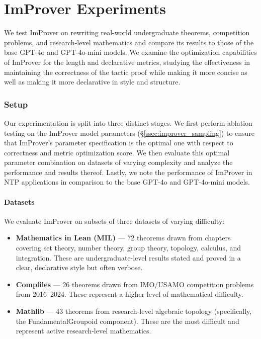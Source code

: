 \chapter{ImProver Experiments}\label{chap:improver-exp}

We test ImProver on rewriting real-world undergraduate theorems, competition problems, and research-level mathematics and compare its results to those of the base GPT-4o and GPT-4o-mini models. We examine the optimization capabilities of ImProver for the length and declarative metrics, studying the effectiveness in maintaining the correctness of the tactic proof while making it more concise as well as making it more declarative in style and structure.

\subsection{Setup}
\label{sec:improver_setup}

Our experimentation is split into three distinct stages. We first perform ablation testing on the ImProver model parameters (\S\ref{ssec:improver_sampling}) to ensure that ImProver's parameter specification is the optimal one with respect to correctness and metric optimization score. We then evaluate this optimal parameter combination on datasets of varying complexity and analyze the performance and results thereof. Lastly, we note the performance of ImProver in NTP applications in comparison to the base GPT-4o and GPT-4o-mini models.

\subsubsection{Datasets}

We evaluate ImProver on subsets of three datasets of varying difficulty:

\begin{itemize}
    \item \textbf{Mathematics in Lean (MIL)} \cite{MIL} --- 72 theorems drawn from chapters covering set theory, number theory, group theory, topology, calculus, and integration. These are undergraduate-level results stated and proved in a clear, declarative style but often verbose.
    \item \textbf{Compfiles} \cite{compfiles} --- 26 theorems drawn from IMO/USAMO competition problems from 2016--2024. These represent a higher level of mathematical difficulty.
    \item \textbf{Mathlib} \cite{The_mathlib_Community_2020} --- 43 theorems from research-level algebraic topology (specifically, the FundamentalGroupoid component). These are the most difficult and represent active research-level mathematics.
\end{itemize}

